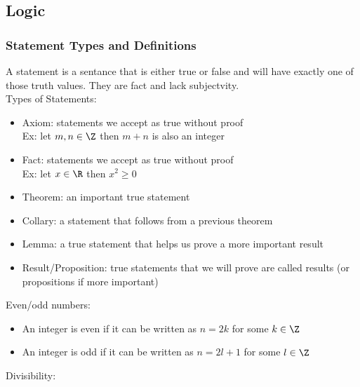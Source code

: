 \subsection{Logic}
\subsubsection{Statement Types and Definitions}
A statement is a sentance that is either true or false and will have exactly one of those truth values. They are fact and lack subjectvity.\\
Types of Statements:
\begin{itemize}
    \item Axiom: statements we accept as true without proof\\
    Ex: let $m,n\in\Z$ then $m+n$ is also an integer
    \item Fact: statements we accept as true without proof\\
    Ex: let $x\in\R$ then $x^2\geq0$
    \item Theorem: an important true statement
    \item Collary: a statement that follows from a previous theorem
    \item Lemma: a true statement that helps us prove a more important result
    \item Result/Proposition: true statements that we will prove are called results (or propositions if more important)
\end{itemize}
Even/odd numbers:
\begin{itemize}
    \item An integer is even if it can be written as $n=2k$ for some $k\in\Z$
    \item An integer is odd if it can be written as $n=2l+1$ for some $l\in\Z$
\end{itemize}
Divisibility:
